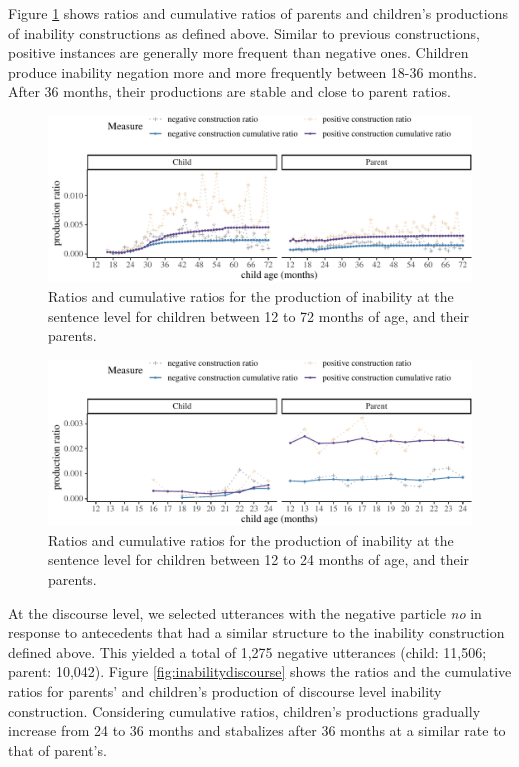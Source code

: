 \documentclass[
  english,
  man,floatsintext]{apa6}
\begin{document}
Figure \ref{fig:inability} shows ratios and cumulative ratios of parents and children's productions of inability constructions as defined above. Similar to previous constructions, positive instances are generally more frequent than negative ones. Children produce inability negation more and more frequently between 18-36 months. After 36 months, their productions are stable and close to parent ratios.

\begin{figure}[H]

{\centering \includegraphics{neg_construction_article_files/figure-latex/inability-1} 

}

\caption{Ratios and cumulative ratios for the production of inability at the sentence level for children between 12 to 72 months of age, and their parents.}\label{fig:inability}
\end{figure}

\begin{figure}[H]

{\centering \includegraphics{neg_construction_article_files/figure-latex/inabilitybegin-1} 

}

\caption{Ratios and cumulative ratios for the production of inability at the sentence level for children between 12 to 24 months of age, and their parents.}\label{fig:inabilitybegin}
\end{figure}

At the discourse level, we selected utterances with the negative particle \emph{no} in response to antecedents that had a similar structure to the inability construction defined above. This yielded a total of 1,275 negative utterances (child: 11,506; parent: 10,042). Figure \ref{fig:inabilitydiscourse} shows the ratios and the cumulative ratios for parents' and children's production of discourse level inability construction. Considering cumulative ratios, children's productions gradually increase from 24 to 36 months and stabalizes after 36 months at a similar rate to that of parent's.
\end{document}
